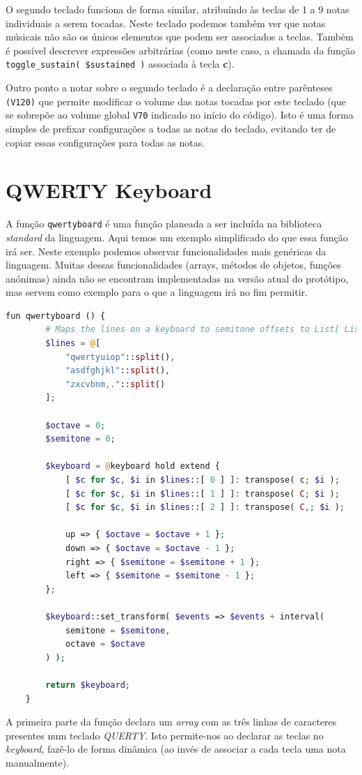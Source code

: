 \documentclass[
  oneside,
  11pt, a4paper,
  footinclude=true,
  headinclude=true,
  cleardoublepage=empty
]{scrbook}
\begin{document}
    O segundo teclado funciona de forma similar, atribuíndo às teclas de 1 a 9 notas individuais a serem tocadas. Neste teclado podemos também ver que notas músicais não são os únicos elementos que podem ser associados a teclas. Também é possível descrever expressões arbitrárias (como neste caso, a chamada da função \texttt{toggle\_sustain( \$sustained )} associada à tecla \textbf{c}).
    
    Outro ponto a notar sobre o segundo teclado é a declaração entre parênteses \texttt{(V120)} que permite modificar o volume das notas tocadas por este teclado (que se sobrepõe ao volume global \texttt{V70} indicado no início do código). Isto é uma forma simples de prefixar configurações a todas as notas do teclado, evitando ter de copiar essas configurações para todas as notas.
    
    \section{QWERTY Keyboard}
    A função \texttt{qwertyboard} é uma função planeada a ser incluída na biblioteca \textit{standard} da linguagem. Aqui temos um exemplo simplificado do que essa função irá ser.
    Neste exemplo podemos observar funcionalidades mais genéricas da linguagem. Muitas dessas funcionalidades (arrays, métodos de objetos, funções anónimas) ainda não se encontram implementadas na versão atual do protótipo, mas servem como exemplo para o que a linguagem irá no fim permitir.
    \begin{lstlisting}[caption=Exemplo da sintaxe proposta da linguagem,language=PHP]
    fun qwertyboard () {
        # Maps the lines on a keyboard to semitone offsets to List[ List[ str ] ]
        $lines = @[
            "qwertyuiop"::split(),
            "asdfghjkl"::split(),
            "zxcvbnm,."::split()
        ];
        
        $octave = 0;
        $semitone = 0;
        
        $keyboard = @keyboard hold extend {
            [ $c for $c, $i in $lines::[ 0 ] ]: transpose( c; $i );
            [ $c for $c, $i in $lines::[ 1 ] ]: transpose( C; $i ); 
            [ $c for $c, $i in $lines::[ 2 ] ]: transpose( C,; $i );
            
            up => { $octave = $octave + 1 };
            down => { $octave = $octave - 1 };
            right => { $semitone = $semitone + 1 };
            left => { $semitone = $semitone - 1 };
        };
        
        $keyboard::set_transform( $events => $events + interval( 
            semitone = $semitone, 
            octave = $octave 
        ) );
        
        return $keyboard;
    }
    \end{lstlisting}
    A primeira parte da função declara um \textit{array} com as três linhas de caracteres presentes num teclado \textit{QUERTY}. Isto permite-nos ao declarar as teclas no \textit{keyboard}, fazê-lo de forma dinâmica (ao invés de associar a cada tecla uma nota manualmente).
    
\end{document}
